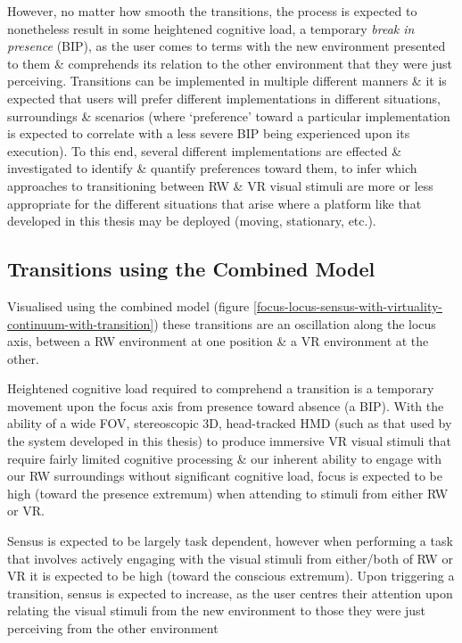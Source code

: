 However, no matter how smooth the transitions, the process is expected to nonetheless result in some heightened cognitive load, a temporary \textit{break in presence}\breakinpresencefootnote{} (BIP), as the user comes to terms with the new environment presented to them \& comprehends its relation to the other environment that they were just perceiving. Transitions can be implemented in multiple different manners \& it is expected that users will prefer different implementations in different situations, surroundings \& scenarios (where `preference' toward a particular implementation is expected to correlate with a less severe BIP being experienced upon its execution). To this end, several different implementations are effected \& investigated to identify \& quantify preferences toward them, to infer which approaches to transitioning between RW \& VR visual stimuli are more or less appropriate for the different situations that arise where a platform like that developed in this thesis may be deployed (moving, stationary, etc.).

\subsection{Transitions using the Combined Model}
Visualised using the combined model (figure \ref{focus-locus-sensus-with-virtuality-continuum-with-transition}) these transitions are an oscillation along the locus axis, between a RW environment at one position \& a VR environment at the other.

Heightened cognitive load required to comprehend a transition is a temporary movement upon the focus axis from presence toward absence (a BIP). With the ability of a wide FOV, stereoscopic 3D, head-tracked HMD (such as that used by the system developed in this thesis) to produce immersive VR visual stimuli that require fairly limited cognitive processing \& our inherent ability to engage with our RW surroundings without significant cognitive load, focus is expected to be high (toward the presence extremum) when attending to stimuli from either RW or VR.

Sensus is expected to be largely task dependent, however when performing a task that involves actively engaging with the visual stimuli from either/both of RW or VR it is expected to be high (toward the conscious extremum). Upon triggering a transition, sensus is expected to increase, as the user centres their attention upon relating the visual stimuli from the new environment to those they were just perceiving from the other environment


